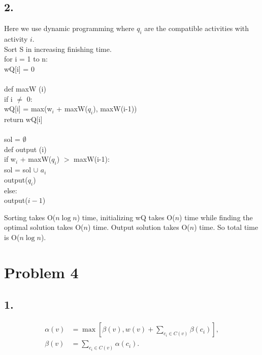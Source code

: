 \documentclass[twoside,11pt]{homework}
\begin{document}
\subsection*{2.}
Here we use dynamic programming where $q_i$ are the compatible activities with activity $i$.\\
Sort S in increasing finishing time. \\
for i = 1 to n: \\
\hspace*{8mm} wQ[i] = 0\\\\
def maxW (i)\\
\hspace*{8mm} if i $\neq$ 0:\\
\hspace*{16mm} wQ[i] = max(w$_i$ + maxW($q_i$), maxW(i-1))\\
\hspace*{8mm} return wQ[i]\\\\
sol = $\emptyset$\\
def output (i) \\
\hspace*{8mm} if w$_i$ + maxW($q_i$) $>$ maxW(i-1): \\
\hspace*{16mm} sol = sol $\cup$ $a_i$\\
\hspace*{16mm} output($q_i$)\\
\hspace*{8mm}else:\\
\hspace*{16mm} output($i-1$)


Sorting takes O($n \log n$) time, initializing wQ takes O($n$) time while finding the optimal solution takes O($n$) time.
Output solution takes O($n$) time.
So total time is O($n \log n$).

\section*{Problem 4}
\subsection*{1.}
\begin{equation}
\begin{split}
\alpha(v) &= \max[\beta(v), w(v) +\sum\limits_{c_i \in C(v)}\beta(c_i)], \\
\beta(v) &= \sum\limits_{c_i \in C(v)}\alpha(c_i).
\end{split}
\end{equation}
\end{document}
